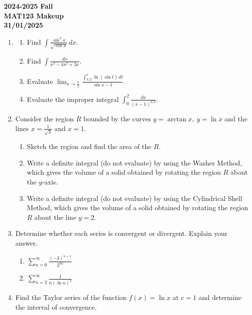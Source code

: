\documentclass[a4paper, 12pt]{article}
\begin{document}
\newpage
{}
{}

\begin{center}
\textbf{2024-2025 Fall\\MAT123 Makeup\\31/01/2025}
\end{center}

\begin{enumerate}[leftmargin=*,label=\textbf{\arabic*.}]
\item \begin{enumerate}[leftmargin=*,label=\textbf{\alph*.}]
\item Find $\displaystyle\int\frac{\sin^3x}{\sqrt{\cos x}}\,dx$.
\item Find $\displaystyle\int\frac{dx}{x^3-4x^2+3x}$.
\item Evaluate $\displaystyle\lim_{x\to\textstyle\frac\pi2}\frac{\displaystyle\int_{\pi/2}^x\ln(\sin t)\,dt}{\sin x-1}$.
\item Evaluate the improper integral $\displaystyle\int_0^2\frac{dx}{(x-1)^{2/3}}$.
\end{enumerate}

\item Consider the region $R$ bounded by the curves $y=\arctan x,\:y=\ln x$ and the lines $\displaystyle x=\frac1{\sqrt3}$ and $x=1$.

\begin{enumerate}[leftmargin=*,label=\textbf{\alph*.}]
\item Sketch the region and find the area of the $R$. 
\item Write a definite integral (do not evaluate) by using the Washer Method, which gives the volume of a solid obtained by rotating the region $R$ about the $y$-axis.
\item Write a definite integral (do not evaluate) by using the Cylindrical Shell Method, which gives the volume of a solid obtained by rotating the region $R$ about the line $y=2$.
\end{enumerate}

\item Determine whether each series is convergent or divergent. Explain your answer.
\begin{enumerate}[leftmargin=*,label=\textbf{\alph*.}]
\item $\displaystyle\sum_{n=0}^\infty\frac{(-3)^{n+1}}{2^{3n}}$
\item $\displaystyle\sum_{n=2}^\infty\frac1{n(\ln n)^2}$
\end{enumerate}

\item Find the Taylor series of the function $f(x)=\ln x$ at $c=1$ and determine the interval of convergence.

\end{enumerate}
\end{document}
